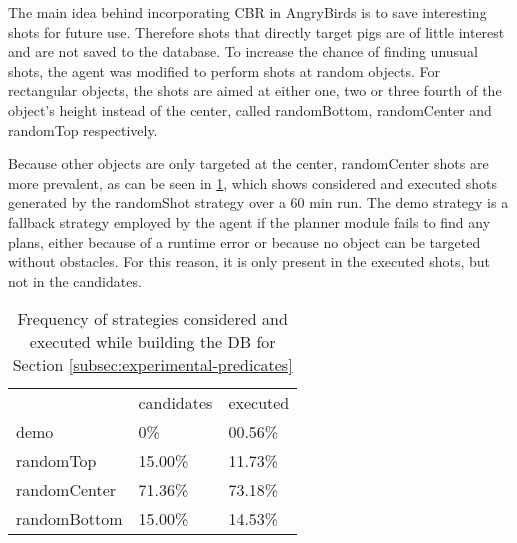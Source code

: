 The main idea behind incorporating CBR in AngryBirds is to save interesting shots for future use. Therefore shots that directly target pigs are of little interest and are not saved to the database.
To increase the chance of finding unusual shots, the agent was modified to perform shots at random objects. For rectangular objects, the shots are aimed at either one, two or three fourth of the object's height instead of the center, called randomBottom, randomCenter and randomTop respectively.

Because other objects are only targeted at the center, randomCenter shots are more prevalent, as can be seen in \ref{tab:strat-distribution}, which shows considered and executed shots generated by the randomShot strategy over a 60 min run.
The demo strategy is a fallback strategy employed by the agent if the planner module fails to find any plans, either because of a runtime error or because no object can be targeted without obstacles. For this reason, it is only present in the executed shots, but not in the candidates.


\begin{table}[b]
    \begin{tabular}{lll}
                     & candidates & executed \\
        demo         & 0\%        & 00.56\%  \\
        randomTop    & 15.00\%    & 11.73\%  \\
        randomCenter & 71.36\%    & 73.18\%  \\
        randomBottom & 15.00\%    & 14.53\%
    \end{tabular}
    \caption{Frequency of strategies considered and executed while building the DB for Section \ref{subsec:experimental-predicates}}
    \label{tab:strat-distribution}
\end{table}